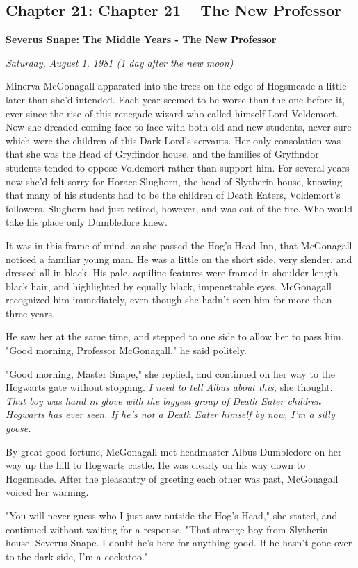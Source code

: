 \documentclass[a4paper,11pt]{article}
\begin{document}
\subsection{Chapter 21: Chapter 21 – The New Professor}

\textbf{Severus Snape: The Middle Years - The New Professor}

\emph{Saturday, August 1, 1981 (1 day after the new moon)}

Minerva McGonagall apparated into the trees on the edge of Hogsmeade a little later than she'd intended. Each year seemed to be worse than the one before it, ever since the rise of this renegade wizard who called himself Lord Voldemort. Now she dreaded coming face to face with both old and new students, never sure which were the children of this Dark Lord's servants. Her only consolation was that she was the Head of Gryffindor house, and the families of Gryffindor students tended to oppose Voldemort rather than support him. For several years now she'd felt sorry for Horace Slughorn, the head of Slytherin house, knowing that many of his students had to be the children of Death Eaters, Voldemort's followers. Slughorn had just retired, however, and was out of the fire. Who would take his place only Dumbledore knew.

It was in this frame of mind, as she passed the Hog's Head Inn, that McGonagall noticed a familiar young man. He was a little on the short side, very slender, and dressed all in black. His pale, aquiline features were framed in shoulder-length black hair, and highlighted by equally black, impenetrable eyes. McGonagall recognized him immediately, even though she hadn't seen him for more than three years.

He saw her at the same time, and stepped to one side to allow her to pass him. "Good morning, Professor McGonagall," he said politely.

"Good morning, Master Snape," she replied, and continued on her way to the Hogwarts gate without stopping. \emph{I need to tell Albus about this,} she thought. \emph{That boy was hand in glove with the biggest group of Death Eater children Hogwarts has ever seen. If he's not a Death Eater himself by now, I'm a silly goose.}

By great good fortune, McGonagall met headmaster Albus Dumbledore on her way up the hill to Hogwarts castle. He was clearly on his way down to Hogsmeade. After the pleasantry of greeting each other was past, McGonagall voiced her warning.

"You will never guess who I just saw outside the Hog's Head," she stated, and continued without waiting for a response. "That strange boy from Slytherin house, Severus Snape. I doubt he's here for anything good. If he hasn't gone over to the dark side, I'm a cockatoo."
\end{document}
